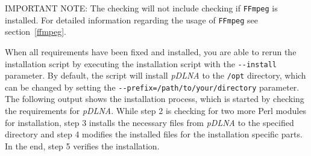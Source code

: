 \documentclass[a4paper,oneside,10pt]{report}
\newenvironment{colframeimportantnote}{%
  \begin{Sbox}
    \begin{minipage}{.99\columnwidth}
}{%
  \end{minipage}
  \end{Sbox}
  \begin{center}
    \fcolorbox{black}{Orange}{\TheSbox}
  \end{center}
}
\begin{document}
\begin{colframeimportantnote}
\textsc{IMPORTANT NOTE:} The checking will not include checking if \verb|FFmpeg| is installed. For detailed information regarding the usage of \verb|FFmpeg| see section~\ref{ffmpeg}.
\end{colframeimportantnote}

When all requirements have been fixed and installed, you are able to rerun the installation script by executing the installation script with the \verb|--install| parameter. By default, the script will install {\em pDLNA} to the \verb|/opt| directory, which can be changed by setting the \verb|--prefix=/path/to/your/directory| parameter. The following output shows the installation process, which is started by checking the requirements for {\em pDLNA}. While step 2 is checking for two more Perl modules for installation, step 3 installs the necessary files from {\em pDLNA} to the specified directory and step 4 modifies the installed files for the installation specific parts. In the end, step 5 verifies the installation.
\end{document}
